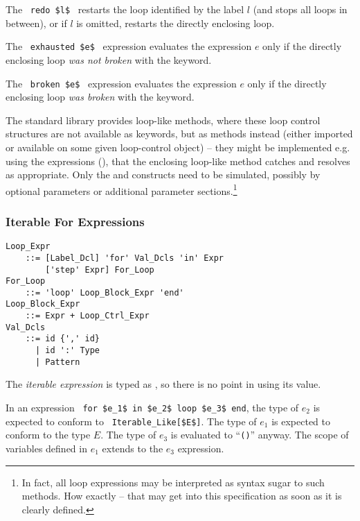 The ~\lstinline!redo $l$!~ restarts the loop identified by the label $l$ (and stops all loops in between), or if $l$ is omitted, restarts the directly enclosing loop. 

The ~\lstinline!exhausted $e$!~ expression evaluates the expression $e$ only if the directly enclosing loop {\em was not broken} with the  keyword. 

The ~\lstinline!broken $e$!~ expression evaluates the expression $e$ only if the directly enclosing loop {\em was broken} with the  keyword. 

The standard library provides loop-like methods, where these loop control structures are not available as keywords, but as methods instead (either imported or available on some given loop-control object) -- they might be implemented e.g. using the  expressions (), that the enclosing loop-like method catches and resolves as appropriate. Only the  and  constructs need to be simulated, possibly by optional parameters or additional parameter sections.\footnote{In fact, all loop expressions may be interpreted as syntax sugar to such methods. How exactly -- that may get into this specification as soon as it is clearly defined.} 





\subsubsection{Iterable For Expressions}
\label{sec:iterable-expressions}

\grammar\begin{lstlisting}
Loop_Expr 
    ::= [Label_Dcl] 'for' Val_Dcls 'in' Expr 
        ['step' Expr] For_Loop
For_Loop 
    ::= 'loop' Loop_Block_Expr 'end'
Loop_Block_Expr 
    ::= Expr + Loop_Ctrl_Expr
Val_Dcls 
    ::= id {',' id}
      | id ':' Type
      | Pattern
\end{lstlisting}

The {\em iterable expression} is typed as , so there is no point in using its value. 

In an expression ~\lstinline!for $e_1$ in $e_2$ loop $e_3$ end!, the type of $e_2$ is expected to conform to ~\lstinline!Iterable_Like[$E$]!. The type of $e_1$ is expected to conform to the type $E$. The type of $e_3$ is evaluated to ``\lstinline!()!'' anyway. The scope of variables defined in $e_1$ extends to the $e_3$ expression. 

